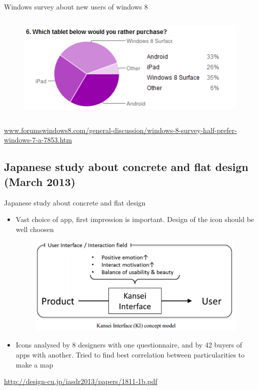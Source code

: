 \documentclass{beamer}
\begin{document}
\begin{frame}{Windows survey about new users of windows 8}
\begin{columns}[c]
\begin{figure}
        \centering
        \includegraphics[scale=0.25]{windows8Tablet.png}
      \end{figure}
      
	\end{columns}
	\begin{flushright}\tiny\url{www.forumswindows8.com/general-discussion/windows-8-survey-half-prefer-windows-7-a-7853.htm}\normalsize\end{flushright}
\end{frame}



\subsection{Japanese study about concrete and flat design (March 2013)}
\begin{frame}{Japanese study about concrete and flat design}
	\begin{itemize}
    \item Vast choice of app, first impression is important. Design of the icon should be well choosen\\
    \begin{figure}
        \centering
        \includegraphics[scale=0.5]{UI.png}
      \end{figure}
    \item Icons analysed by 8 designers with one questionnaire, and by 42 buyers of apps with another. Tried to find best correlation between particularities to make a map
    \end{itemize}
	\begin{flushright}\tiny\url{http://design-cu.jp/iasdr2013/papers/1811-1b.pdf}\normalsize\end{flushright}
\end{frame}
\end{document}
